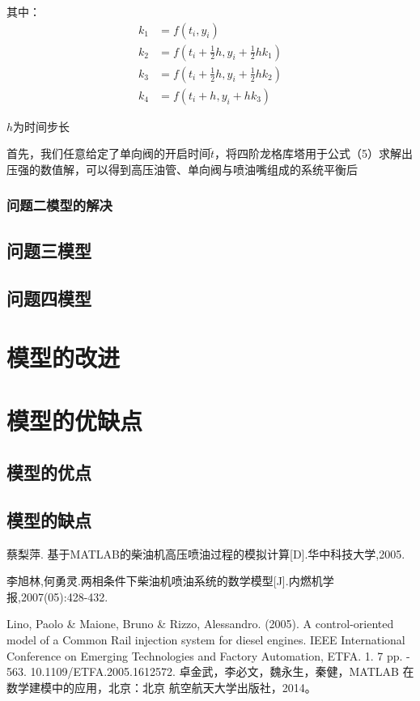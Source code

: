 \documentclass[withoutpreface,bwprint]{cumcmthesis} %
\begin{document}
其中：
\begin{align*}
k_{1}&=f(t_{i},y_{i})\\
k_{2}&=f(t_{i}+\frac{1}{2}h,y_{i}+\frac{1}{2}hk_{1})\\
k_{3}&=f(t_{i}+\frac{1}{2}h,y_{i}+\frac{1}{2}hk_{2})\\
k_{4}&=f(t_{i}+h,y_{i}+hk_{3})
\end{align*}

$h$为时间步长

首先，我们任意给定了单向阀的开启时间$\widetilde{t}$，将四阶龙格库塔用于公式（5）求解出压强的数值解，可以得到高压油管、单向阀与喷油嘴组成的系统平衡后





\subsubsection{问题二模型的解决}

 
\subsection{问题三模型}

\subsection{问题四模型}


\section{模型的改进}


\section{模型的优缺点}
\subsection{模型的优点}

\subsection{模型的缺点}



\begin{thebibliography}{9}%
  蔡梨萍. 基于MATLAB的柴油机高压喷油过程的模拟计算[D].华中科技大学,2005.
 
 李旭林,何勇灵.两相条件下柴油机喷油系统的数学模型[J].内燃机学报,2007(05):428-432.
 
 Lino, Paolo \& Maione, Bruno \& Rizzo, Alessandro. (2005). A control-oriented model of a Common Rail injection system for diesel engines. IEEE International Conference on Emerging Technologies and Factory Automation, ETFA. 1. 7 pp. - 563. 10.1109/ETFA.2005.1612572. 
 卓金武，李必文，魏永生，秦健，MATLAB 在数学建模中的应用，北京：北京 航空航天大学出版社，2014。

\end{thebibliography}
\end{document}
